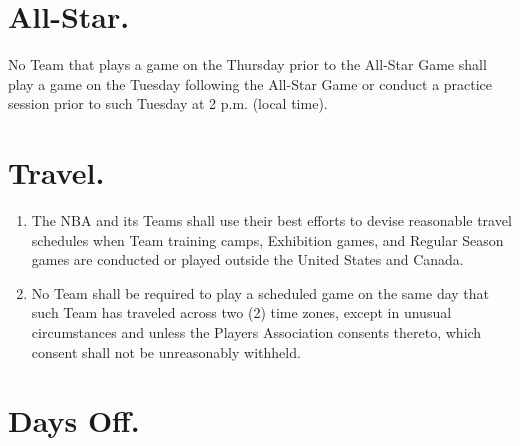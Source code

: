 \documentclass[
]{book}
\providecommand{\tightlist}{%
  \setlength{\itemsep}{0pt}\setlength{\parskip}{0pt}}
\begin{document}
\hypertarget{all-star.}{%
\section{All-Star.}\label{all-star.}}

No Team that plays a game on the Thursday prior to the All-Star Game shall play a game on the Tuesday following the All-Star Game or conduct a practice session prior to such Tuesday at 2 p.m. (local time).

\hypertarget{travel.}{%
\section{Travel.}\label{travel.}}

\begin{enumerate}
\def\labelenumi{(\alph{enumi})}
\tightlist
\item
  The NBA and its Teams shall use their best efforts to devise reasonable travel schedules when Team training camps, Exhibition games, and Regular Season games are conducted or played outside the United States and Canada.
\item
  No Team shall be required to play a scheduled game on the same day that such Team has traveled across two (2) time zones, except in unusual circumstances and unless the Players Association consents thereto, which consent shall not be unreasonably withheld.
\end{enumerate}

\hypertarget{days-off.}{%
\section{Days Off.}\label{days-off.}}
\end{document}
